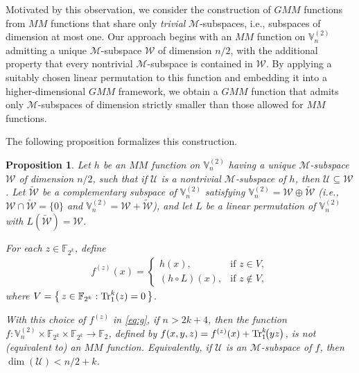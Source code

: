 \documentclass[12pt]{article}
\theoremstyle{plain}
\newtheorem{proposition}[lemma]{Proposition}
\theoremstyle{definition}
\newcommand{\V}{\mathbb{V}}
\renewcommand{\to}{\rightarrow}
\newcommand{\Tr}{{\rm Tr}}
\begin{document}
	Motivated by this observation, we consider the construction of \(GMM\) functions
	from \(MM\) functions that share only \textit{trivial} \(\mathcal{M}\)-subspaces, i.e.,
	subspaces of dimension at most one.
	Our approach begins with an \(MM\) function on \(\V_n^{(2)}\) admitting a unique
	\(\mathcal{M}\)-subspace \(\mathcal{W}\) of dimension \(n/2\), with the
	additional property that every nontrivial \(\mathcal{M}\)-subspace is contained in
	\(\mathcal{W}\).
	By applying a suitably chosen linear permutation to this function and
	embedding it into a higher-dimensional \(GMM\) framework, we obtain a \(GMM\) function
	that admits only \(\mathcal{M}\)-subspaces of dimension strictly smaller than
	those allowed for \(MM\) functions.
	
	The following proposition formalizes this construction.
	
	\begin{proposition}\label{thm:main}
		Let \(h\) be an \(MM\) function on \(\V_n^{(2)}\) 
		having a unique 
		\(\mathcal{M}\)-subspace \(\mathcal{W}\) of dimension \(n/2\), such that if $\mathcal{U}$ is a nontrivial
		\(\mathcal{M}\)-subspace of $h$, then $\mathcal{U}\subseteq \mathcal{W}$. Let  \(\widetilde{\mathcal{W}}\) be a complementary subspace of \(\V_n^{(2)}\) satisfying 
		\(\V_n^{(2)} =\mathcal{W} \oplus \widetilde{\mathcal{W}}\) (i.e., $\mathcal{W} \cap \widetilde{\mathcal{W}}=\{0\}$ and \(\V_n^{(2)} =\mathcal{W} + \widetilde{\mathcal{W}}\)), and let \(L\) be a linear permutation of \(\V_n^{(2)}\) with 
		\({L}( \widetilde{\mathcal{W}} ) = \mathcal{W}\).
		
		For each \(z\in\mathbb{F}_{2^k}\), define  
		\begin{align}\label{eq:g}
			f^{(z)}(x) =
			\begin{cases}
				h(x), & \text{if } z \in V,\\[6pt]
				(h\circ L)(x), & \text{if } z \not\in V,
			\end{cases}
		\end{align}
		where $	V = \bigl\{\, z \in \mathbb{F}_{2^k} : \Tr_1^k(z)=0 \,\bigr\}$.
		
		With this choice of \(f^{(z)}\) in \eqref{eq:g}, if \(n > 2k+4\), 
		then the function $	f:\V_n^{(2)} \times \mathbb{F}_{2^k} \times \mathbb{F}_{2^k} \to \mathbb{F}_{2}$, defined by $f(x,y,z) = f^{(z)}(x) + \Tr_1^k\!\bigl(y z\bigr)$, is not (equivalent to) an \(MM\) function. 
		Equivalently, if \(\mathcal{U}\) is an \(\mathcal{M}\)-subspace of \(f\), then 
		\(\dim(\mathcal{U}) < n/2 + k\).
	\end{proposition}
	
\end{document}
